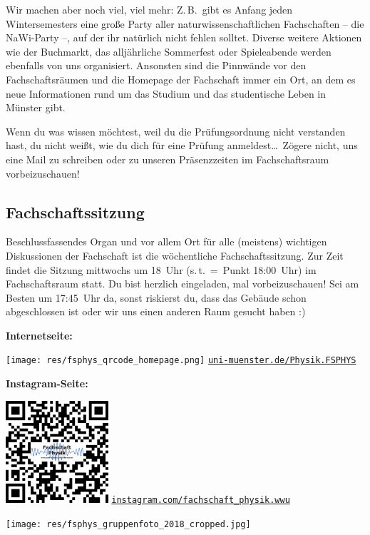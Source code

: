 \begin{multicols}{2}
Wir machen aber noch viel, viel mehr: Z.\,B.\ gibt es Anfang jeden Wintersemesters eine große Party aller naturwissenschaftlichen Fachschaften -- die NaWi-Party --, auf der ihr natürlich nicht fehlen solltet.
Diverse weitere Aktionen wie der Buchmarkt, das alljährliche Sommerfest oder Spieleabende werden ebenfalls von uns organisiert.
Ansonsten sind die Pinnwände vor den Fachschaftsräumen und die Homepage der Fachschaft immer ein Ort, an dem es neue Informationen rund um das Studium und das studentische Leben in Münster gibt.

Wenn du was wissen möchtest, weil du die Prüfungsordnung nicht verstanden hast, du nicht weißt, wie du dich für eine Prüfung anmeldest\dots\
Zögere nicht, uns eine Mail zu schreiben oder zu unseren Präsenzzeiten im Fachschaftsraum vorbeizuschauen!

\subsection*{Fachschaftssitzung}
Beschlussfassendes Organ und vor allem Ort für alle (meistens) wichtigen Diskussionen  der Fachschaft ist die wöchentliche Fachschaftssitzung.
Zur Zeit findet die Sitzung mittwochs um 18~Uhr (s.\,t.~=~Punkt 18:00~Uhr) im Fachschaftsraum statt.
Du bist herzlich eingeladen, mal vorbeizuschauen! Sei am Besten um 17:45~Uhr da, sonst riskierst du, dass das Gebäude schon abgeschlossen ist oder wir uns einen anderen Raum gesucht haben :)

\begin{minipage}{\columnwidth}
	\begin{minipage}[t]{5cm}
		\raggedright\parskip=0.1cm
		\textbf{Internetseite:}
	
		\texttt{[image: res/fsphys\_qrcode\_homepage.png]}
		\scriptsize
		\href{https://www.uni-muenster.de/Physik.FSPHYS/}{\texttt{uni-muenster.de/Physik.FSPHYS}}
	\end{minipage}
	\hfill
	\begin{minipage}[t]{4cm}
		\raggedleft\parskip=0.1cm
		\textbf{Instagram-Seite:}
	
		\includegraphics[width=3.8cm]{res/fsphys_qrcode_instagram.pdf}
		\scriptsize
		\href{https://www.instagram.com/fachschaft_physik.wwu}{\texttt{instagram.com/fachschaft_physik.wwu}}
	\end{minipage}
\end{minipage}
\end{multicols}
\vfill
\begin{center}
	\vspace{-2mm}
	\texttt{[image: res/fsphys\_gruppenfoto\_2018\_cropped.jpg]}
\end{center}

